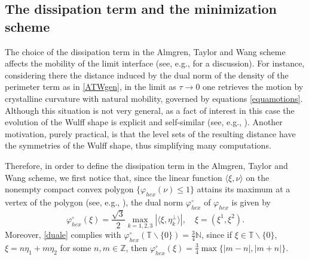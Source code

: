 \documentclass{interact}
\numberwithin{equation}{section}
\theoremstyle{definition}
\newcommand{\Z}{\mathbb{Z}}
\newcommand{\N}{\mathbb{N}}
\begin{document}
\subsection{The dissipation term and the minimization scheme}\label{timemin} 

The choice of the dissipation term in the Almgren, Taylor and Wang scheme affects the mobility of the limit interface (see, e.g., \cite[Section~1]{Ta0} for a discussion). For instance, considering there the distance induced by the dual norm of the density of the perimeter term as in \eqref{ATWgen}, in the limit as $\tau\to0$ one retrieves the motion by crystalline curvature with natural mobility, governed by equations \eqref{equamotions}. Although this situation is not very general, as a fact of interest in this case the evolution of the Wulff shape is explicit and self-similar (see, e.g., \cite{BePa, CC}). Another motivation, purely practical, is that the level sets of the resulting distance have the symmetries of the Wulff shape, thus simplifying many computations.

Therefore, in order to define the dissipation term in the Almgren, Taylor and Wang scheme, we first notice that, since the linear function $\langle \xi,\nu\rangle$ on the nonempty compact convex polygon $\{\varphi_{hex}(\nu)\leq1\}$ attains its maximum at a vertex of the polygon (see, e.g., \cite[Corollary 32.3.2]{Rock}), the dual norm $\varphi^\circ_{hex}$ of $\varphi_{hex}$ is given by
\begin{equation}
\varphi_{hex}^\circ(\xi)=\frac{\sqrt{3}}{2}\max_{k=1,2,3}|\langle \xi, \eta_k^\perp\rangle|,\quad \xi=(\xi^1,\xi^2).%
\label{duale}
\end{equation}
{Moreover, \eqref{duale} complies with $\varphi_{hex}^\circ(\mathbb{T}\backslash\{0\})=\frac{3}{4}\N$, since if $\xi\in\mathbb{T}\backslash\{0\}$, $\xi=n\eta_1+m\eta_2$ for some $n,m\in\Z$, then $\varphi_{hex}^\circ(\xi)=\frac{3}{4}\max\{|m-n|,|m+n|\}$.}\\
\end{document}
